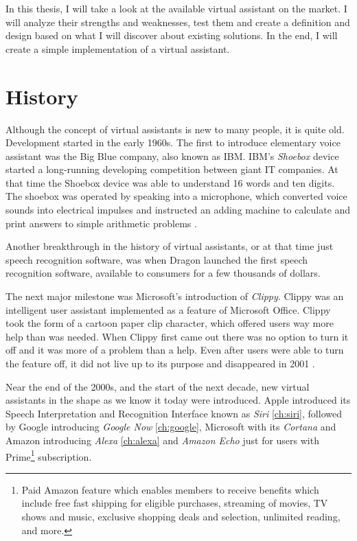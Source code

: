 \documentclass[
  digital, %
  oneside, %
  table,   %
  lof,     %
  lot,     %
]{fithesis3}
\begin{document}
In this thesis, I will take a look at the available virtual assistant on the market. I will analyze their strengths and weaknesses, test them and create a definition and design based on what I will discover about existing solutions. In the end, I will create a simple implementation of a virtual assistant.

\chapter{History}
Although the concept of virtual assistants is new to many people, it is quite old. Development started in the early 1960s. The first to introduce elementary voice assistant was the Big Blue company, also known as IBM. IBM's \textit{Shoebox} device started a long-running developing competition between giant IT companies. At that time the Shoebox device was able to understand 16 words and ten digits. The shoebox was operated by speaking into a microphone, which converted voice sounds into electrical impulses and instructed an adding machine to calculate and print answers to simple arithmetic problems \parencite{shoebox}.

Another breakthrough in the history of virtual assistants, or at that time just speech recognition software, was when Dragon launched the first speech recognition software, available to consumers for a few thousands of dollars.

The next major milestone was Microsoft's introduction of \textit{Clippy}. Clippy was an intelligent user assistant implemented as a feature of Microsoft Office. Clippy took the form of a cartoon paper clip character, which offered users way more help than was needed. When Clippy first came out there was no option to turn it off and it was more of a problem than a help. Even after users were able to turn the feature off, it did not live up to its purpose and disappeared in 2001 \parencite{clippy}.

Near the end of the 2000s, and the start of the next decade, new virtual assistants in the shape as we know it today were introduced. Apple introduced its Speech Interpretation and Recognition Interface known as \textit{Siri} \ref{ch:siri}, followed by Google introducing \textit{Google Now} \ref{ch:google}, Microsoft with its \textit{Cortana} and Amazon introducing \textit{Alexa} \ref{ch:alexa} and \textit{Amazon Echo} just for users with Prime\footnote{Paid Amazon feature which enables members to receive benefits which include free fast shipping for eligible purchases, streaming of movies, TV shows and music, exclusive shopping deals and selection, unlimited reading, and more.} subscription.
\end{document}

